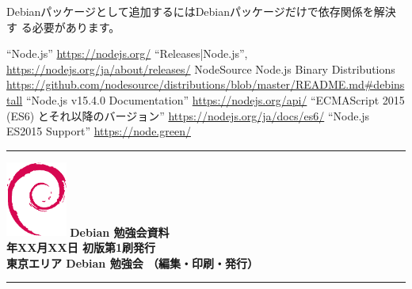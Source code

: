 \documentclass[mingoth,a4paper]{jsarticle}
\newcommand{\debmtgyear}{2020}
\newcommand{\debmtgmonth}{XX}
\newcommand{\debmtgdate}{XX}
\begin{document}
Debianパッケージとして追加するにはDebianパッケージだけで依存関係を解決す
る必要があります。

\begin{thebibliography}{1}
  ``Node.js'' \url{https://nodejs.org/}
  ``Releases|Node.js'', \url{https://nodejs.org/ja/about/releases/}
  NodeSource Node.js Binary Distributions
	 \url{https://github.com/nodesource/distributions/blob/master/README.md#debinstall}
  ``Node.js v15.4.0 Documentation''  \url{https://nodejs.org/api/}
  ``ECMAScript 2015 (ES6) とそれ以降のバージョン''
	 \url{https://nodejs.org/ja/docs/es6/}
  ``Node.js ES2015 Support'' \url{https://node.green/}
\end{thebibliography}



\mbox{}\newpage
\mbox{}\newpage

\vspace*{15cm}
\hrule
\vspace{2mm}
\includegraphics[width=2cm]{image200502/openlogo-nd.eps}
\noindent \Large \bf Debian 勉強会資料\\
\noindent \normalfont \debmtgyear{}年\debmtgmonth{}月\debmtgdate{}日 \hspace{5mm}  初版第1刷発行\\
\noindent \normalfont 東京エリア Debian 勉強会 （編集・印刷・発行）\\
\hrule
\end{document}
